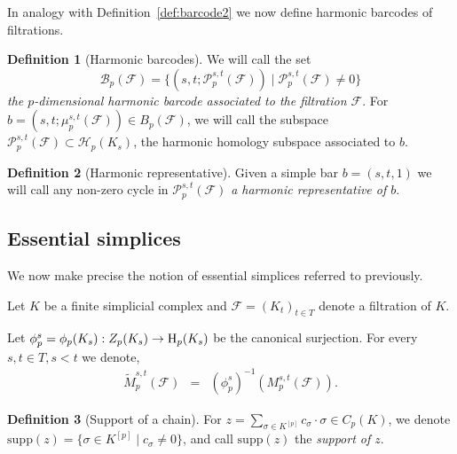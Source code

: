 \documentclass[11pt]{amsart}
\theoremstyle{theorem}
\theoremstyle{remark}
\theoremstyle{definition}
\newtheorem{definition}{Definition}[section]
\newcommand{\sqbracket}[1]{[#1]}
\newcommand{\HH}  {\mbox{\rm H}}
\newcommand{\supp}{\mathrm{supp}}
\begin{document}
In analogy with Definition~\ref{def:barcode2} we now define harmonic barcodes of filtrations. 
\begin{definition}[Harmonic barcodes]
\label{def:harmonic-barcode2}
We will call the set
\[
\mathbf{\mathcal{B}}_p(\mathcal{F}) = \{(s,t;\mathcal{P}^{s,t}_p(\mathcal{F})) \mid  \mathcal{P}^{s,t}_p(\mathcal{F}) \neq  0\}
\]
\emph{the $p$-dimensional harmonic barcode associated to the filtration $\mathcal{F}$}.
For ${b} = (s,t;\mu^{s,t}_p(\mathcal{F})) \in {B}_p(\mathcal{F})$, we will call the subspace
$\mathcal{P}^{s,t}_p(\mathcal{F}) \subset \mathcal{H}_p(K_s)$, the harmonic homology subspace associated to
$b$.
\end{definition}

\begin{definition}[Harmonic representative]
\label{def:harmonic-rep}
Given a simple bar $b = (s,t,1)$ we will call any non-zero cycle in $\mathcal{P}^{s,t}_p(\mathcal{F})$
\emph{a harmonic representative of $b$}.
\end{definition}


\subsection{Essential simplices
}
\label{subsec:essential}
We now make precise the notion of essential simplices referred to previously.

Let $K$ be a finite simplicial complex and 
$\mathcal{F} = (K_t)_{t \in T}$
denote a filtration
of $K$. 



Let $\phi_p^s = \phi_p(K_s): Z_p(K_s) \rightarrow \HH_p(K_s)$ be the canonical surjection. 
For every $s,t\in T, s < t$ we denote,
\begin{eqnarray}
\label{eqn:tildeM}
\widetilde{M}_p^{s,t}(\mathcal{F}) &=& (\phi_p^s)^{-1}(M_p^{s,t}(\mathcal{F})).
\end{eqnarray}






\begin{definition}[Support of a chain]
\label{def:support}
For $z = \sum_{\sigma \in K^{\sqbracket{p}}}c_\sigma \cdot \sigma \in C_p(K)$, we denote 
$\supp(z) = \{\sigma \in K^{\sqbracket{p}} \mid c_\sigma \neq 0\}$, and call $\supp(z)$ the
\emph{support of $z$}.
\end{definition}

\end{document}

